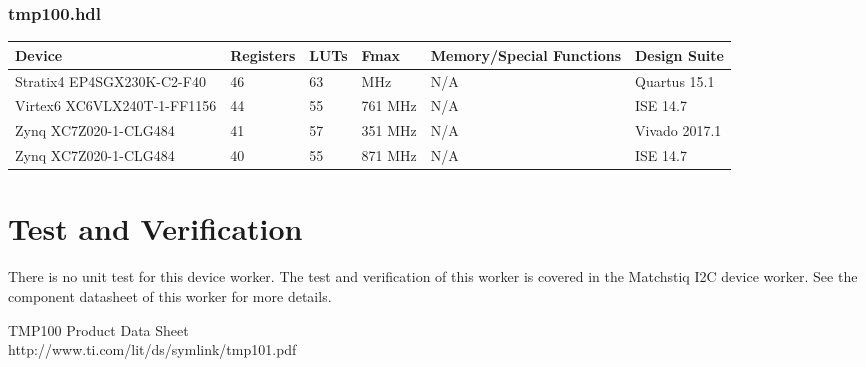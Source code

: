 \documentclass{article}
\def\comp{tmp100}
\def\Comp{TMP100}
\begin{document}
\subsubsection*{\comp.hdl}
\begin{scriptsize}
	\begin{tabular}{|M{4.5cm}|M{1cm}|M{1cm}|M{1.5cm}|M{2cm}|M{2cm}|}
		\hline
		Device                      & Registers & LUTs & Fmax    & Memory/Special Functions & Design Suite	\\
		\hline
		Stratix4 EP4SGX230K-C2-F40  & 46        & 63   &     MHz & N/A                      & Quartus 15.1	\\
		\hline
		Virtex6 XC6VLX240T-1-FF1156 & 44        & 55   & 761 MHz & N/A                      & ISE 14.7 	\\
		\hline
		Zynq XC7Z020-1-CLG484       & 41        & 57   & 351 MHz & N/A                      & Vivado 2017.1 	\\
		\hline
		Zynq XC7Z020-1-CLG484       & 40        & 55   & 871 MHz & N/A                      & ISE 14.7 	\\
		\hline
	\end{tabular}
\end{scriptsize}

\section*{Test and Verification}
There is no unit test for this device worker. The test and verification of this worker is covered in the Matchstiq I2C device worker. See the component datasheet of this worker for more details.
  \begin{thebibliography}{1}

   \Comp{} Product Data Sheet\\
	http://www.ti.com/lit/ds/symlink/tmp101.pdf
  \end{thebibliography}
\end{document}
